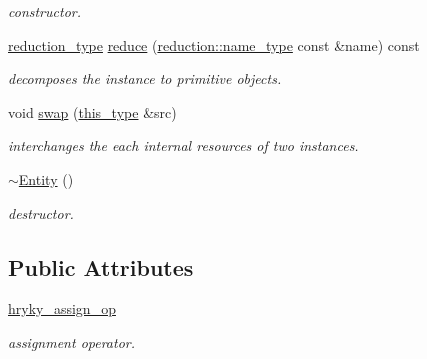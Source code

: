 \begin{DoxyCompactItemize}
\begin{DoxyCompactList}\small\item\em constructor. \end{DoxyCompactList}\item 
\hypertarget{classhryky_1_1http_1_1method_1_1_entity_af566f6444977307aae49759f466ca0ea}{\hyperlink{namespacehryky_a343a9a4c36a586be5c2693156200eadc}{reduction\-\_\-type} \hyperlink{classhryky_1_1http_1_1method_1_1_entity_af566f6444977307aae49759f466ca0ea}{reduce} (\hyperlink{namespacehryky_1_1reduction_ac686c30a4c8d196bbd0f05629a6b921f}{reduction\-::name\-\_\-type} const \&name) const }\label{classhryky_1_1http_1_1method_1_1_entity_af566f6444977307aae49759f466ca0ea}

\begin{DoxyCompactList}\small\item\em decomposes the instance to primitive objects. \end{DoxyCompactList}\item 
\hypertarget{classhryky_1_1http_1_1method_1_1_entity_a5e7fb9634f8b20eca0b6d14b04ed01e4}{void \hyperlink{classhryky_1_1http_1_1method_1_1_entity_a5e7fb9634f8b20eca0b6d14b04ed01e4}{swap} (\hyperlink{classhryky_1_1http_1_1method_1_1_entity_a3953ff7f851afb4c64fde9ab521deb88}{this\-\_\-type} \&src)}\label{classhryky_1_1http_1_1method_1_1_entity_a5e7fb9634f8b20eca0b6d14b04ed01e4}

\begin{DoxyCompactList}\small\item\em interchanges the each internal resources of two instances. \end{DoxyCompactList}\item 
\hypertarget{classhryky_1_1http_1_1method_1_1_entity_a972aa8a766ee5e20f742f8694d55f17f}{\hyperlink{classhryky_1_1http_1_1method_1_1_entity_a972aa8a766ee5e20f742f8694d55f17f}{$\sim$\-Entity} ()}\label{classhryky_1_1http_1_1method_1_1_entity_a972aa8a766ee5e20f742f8694d55f17f}

\begin{DoxyCompactList}\small\item\em destructor. \end{DoxyCompactList}\end{DoxyCompactItemize}
\subsection*{Public Attributes}
\begin{DoxyCompactItemize}
\item 
\hypertarget{classhryky_1_1http_1_1method_1_1_entity_afec9520084c04892ec3d09ca4a900042}{\hyperlink{classhryky_1_1http_1_1method_1_1_entity_afec9520084c04892ec3d09ca4a900042}{hryky\-\_\-assign\-\_\-op}}\label{classhryky_1_1http_1_1method_1_1_entity_afec9520084c04892ec3d09ca4a900042}

\begin{DoxyCompactList}\small\item\em assignment operator. \end{DoxyCompactList}\end{DoxyCompactItemize}



